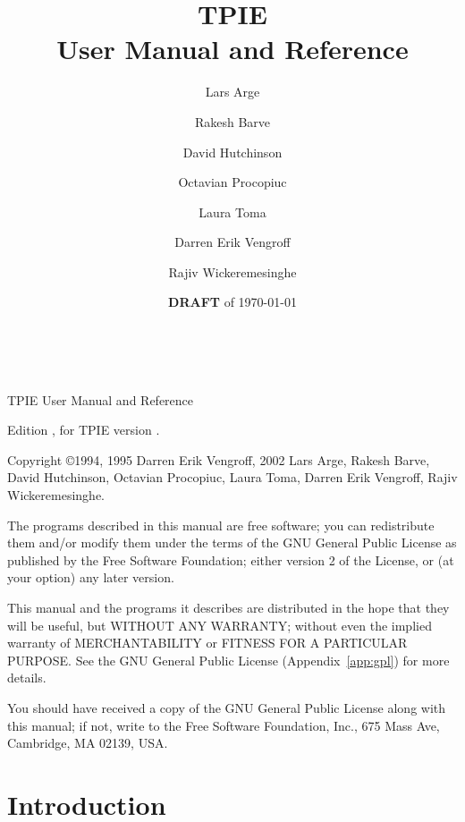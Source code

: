 \documentclass[10pt]{book}
\begin{document}
\title{{\Huge TPIE}\\ User Manual and Reference}
\author{%
Lars Arge \and 
Rakesh Barve \and 
David Hutchinson \and 
Octavian Procopiuc \and 
Laura Toma \and
Darren Erik Vengroff \and 
Rajiv Wickeremesinghe}

\date{{\bf DRAFT} of \today}

\maketitle

\begin{titlepage}
\mbox{ }

\vspace{\fill}

\noindent TPIE User Manual and Reference

\noindent Edition \edition, for TPIE version \version.

\vspace{2ex}

\noindent Copyright \copyright 1994, 1995 Darren Erik Vengroff, 2002 Lars
Arge, Rakesh Barve, David Hutchinson, Octavian Procopiuc, Laura Toma, Darren Erik
Vengroff, Rajiv Wickeremesinghe.

\vspace{2ex}

The programs described in this manual are free software; you can
redistribute them and/or modify them under the terms of the GNU General
Public License as published by the Free Software Foundation; either
version 2 of the License, or (at your option) any later version.

This manual and the programs it describes are distributed in the hope
that they will be useful, but WITHOUT ANY WARRANTY; without even the
implied warranty of MERCHANTABILITY or FITNESS FOR A PARTICULAR
PURPOSE.  See the GNU General Public License (Appendix~\ref{app:gpl})
for more details.

You should have received a copy of the GNU General Public License
along with this manual; if not, write to the Free Software Foundation,
Inc., 675 Mass Ave, Cambridge, MA 02139, USA.
\end{titlepage}

\tableofcontents

\chapter*{Introduction}
\end{document}
